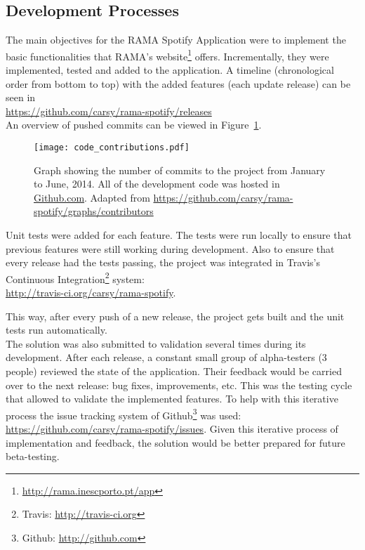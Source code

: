   \subsection{Development Processes} %
    \label{sub:development_process}

    The main objectives for the RAMA Spotify Application were to implement the basic functionalities that RAMA's website\footnote{\url{http://rama.inescporto.pt/app}} offers.
    Incrementally, they were implemented, tested and added to the application.
    A timeline (chronological order from bottom to top) with the added features (each update release) can be seen in \\ 
    \indent \url{https://github.com/carsy/rama-spotify/releases} \\

    An overview of pushed commits can be viewed in Figure~\ref{fig:code_contributions}.

    \begin{figure}[H]
      \begin{center}
        \texttt{[image: code\_contributions.pdf]}
      \end{center}
      \caption{Graph showing the number of commits to the project from January to June, 2014. All of the development code was hosted in \url{Github.com}. Adapted from \url{https://github.com/carsy/rama-spotify/graphs/contributors}}
      \label{fig:code_contributions}
    \end{figure}

    Unit tests were added for each feature.
    The tests were run locally to ensure that previous features were still working during development.
    Also to ensure that every release had the tests passing, the project was integrated in Travis's Continuous Integration\footnote{Travis: \url{http://travis-ci.org}} system: \\
    \indent \url{http://travis-ci.org/carsy/rama-spotify}.

    This way, after every push of a new release, the project gets built and the unit tests run automatically. \\

    The solution was also submitted to validation several times during its development.
    After each release, a constant small group of alpha-testers (3 people) reviewed the state of the application.
    Their feedback would be carried over to the next release: bug fixes, improvements, etc.
    This was the testing cycle that allowed to validate the implemented features.
    To help with this iterative process the issue tracking system of Github\footnote{Github: \url{http://github.com}} was used: \url{https://github.com/carsy/rama-spotify/issues}.
    Given this iterative process of implementation and feedback, the solution would be better prepared for future beta-testing.

